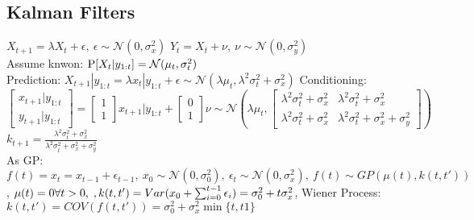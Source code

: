 \subsection{Kalman Filters}
$X_{t+1}=\lambda X_{t}+\epsilon,\ \epsilon \sim \mathcal{N}(0, \sigma_{x}^{2})$
$Y_{t} = X_{t} + \nu,\ \nu \sim \mathcal{N}(0, \sigma_{y}^{2})$ \\
Assume knwon: $\prob{X_{t}|y_{1:t}}=\mathcal{N}(\mu_{t}, \sigma_{t}^{2})$ \\
Prediction: $X_{t+1}|y_{1:t} = \lambda x_{t}|y_{1:t} + \epsilon \sim
\mathcal{N}(\lambda \mu_{t}, \lambda^{2}\sigma_{t}^{2}+\sigma_{x}^{2})$
Conditioning:
$\begin{bmatrix} x_{t+1}|y_{1:t} \\ y_{t+1}|y_{1:t}\end{bmatrix} =
\begin{bmatrix} 1 \\ 1 \end{bmatrix} x_{t+1}|y_{1:t} + \begin{bmatrix} 0 \\ 1 \end{bmatrix} \nu
\sim \mathcal{N}(\lambda \mu_{t},
\begin{bmatrix} \lambda^{2} \sigma^{2}_{t} + \sigma^{2}_{x} & \lambda^{2} \sigma^{2}_{t} + \sigma^{2}_{x} \\
\lambda^{2} \sigma^{2}_{t} + \sigma^{2}_{x} & \lambda^{2} \sigma^{2}_{t} + \sigma^{2}_{x} + \sigma^{2}_{y}
\end{bmatrix})$
$k_{t+1} = \frac{\lambda^{2} \sigma^{2}_{t} + \sigma^{2}_{x}}{\lambda^{2} \sigma^{2}_{t} + \sigma^{2}_{x} + \sigma^{2}_{y}}$\\
As GP:
$f(t) = x_{t} = x_{t-1} + \epsilon_{t-1},\ x_{0} \sim \mathcal{N}(0, \sigma_{0}^{2}),\
\epsilon_{t} \sim \mathcal{N}(0, \sigma_{x}^{2}),\ f(t) \sim GP(\mu(t), k(t, t'))$,
$\mu(t) = 0 \Forall {t>0}, k(t,t')=Var(x_{0}+ \sum_{i=0}^{t-1}\epsilon_{i}) = \sigma_{0}^{2} + t\sigma_{x}^{2}$,
Wiener Process: $k(t,t') = COV(f(t,t')) = \sigma_{0}^{2}+\sigma_{x}^{2}\min\{t,t1\}$



